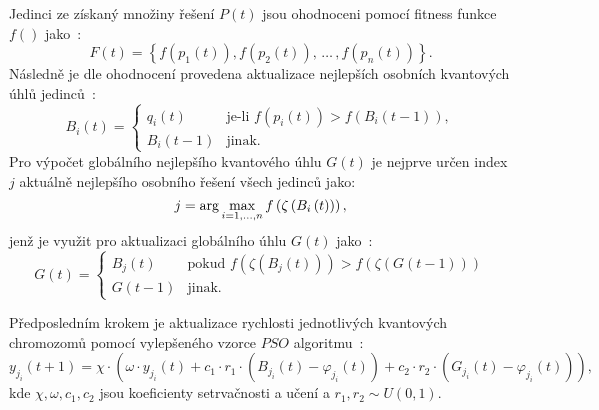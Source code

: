 Jedinci ze získaný množiny řešení $P\left(t\right)$ jsou ohodnoceni pomocí fitness funkce $f\left(\right)$ jako~\cite{qse}: 
\begin{equation*}
    F\left(t\right) = \left\{ f\left(p_1\left(t\right)\right), f\left(p_2\left(t\right)\right), \,\dots\,, f\left(p_n\left(t\right)\right) \right\}.
\end{equation*}
Následně je dle ohodnocení provedena aktualizace nejlepších osobních kvantových úhlů jedinců~\cite{qse}:
\begin{equation}\label{eq:pers-best}
    B_i\left(t\right) =
    \begin{cases}
        q_i\left(t\right)   & \text{je-li } f\left(p_i\left(t\right)\right) > f\left(B_i\left(t-1\right)\right), \\
        B_i\left(t-1\right) & \text{jinak.}
    \end{cases}
\end{equation}
Pro výpočet globálního nejlepšího kvantového úhlu $G\left(t\right)$ je nejprve určen index $j$ aktuálně nejlepšího osobního řešení všech jedinců jako:
\begin{equation*}
    j = \arg\max_{i=1,\dots,n} f\left(\zeta\left(B_i\left(t\right)\right)\right),\\[5pt]
\end{equation*}
jenž je využit pro aktualizaci globálního úhlu $G\left(t\right)$ jako~\cite{qse}:
\begin{equation}\label{eq:glob-best}
    G\left(t\right) =
    \begin{cases}
        B_j\left(t\right)   & \text{pokud } f\left(\zeta\left(B_j\left(t\right)\right)\right) > f\left(\zeta\left(G\left(t-1\right)\right)\right) \\
        G\left(t-1\right)   & \text{jinak.}
    \end{cases}
\end{equation}

Předposledním krokem je aktualizace rychlosti jednotlivých kvantových chromozomů pomocí vylepšeného vzorce $PSO$ algoritmu~\cite{qse}: 
\begin{equation}\label{eq:qse-velocity}
    y_{j_i}\left(t+1\right) = \chi \cdot
    \left( \omega \cdot y_{j_i}\left(t\right) 
        + c_1 \cdot r_1 \cdot \left(B_{j_i}\left(t\right) - \varphi_{j_i}\left(t\right) \right)
        + c_2 \cdot r_2 \cdot \left( G_{j_i}\left(t\right) - \varphi_{j_i}\left(t\right) \right)\right),
\end{equation}
kde $\chi, \omega, c_1 , c_2$ jsou koeficienty setrvačnosti a učení a $r_1,r_2\sim U\left(0,1\right)$.  


